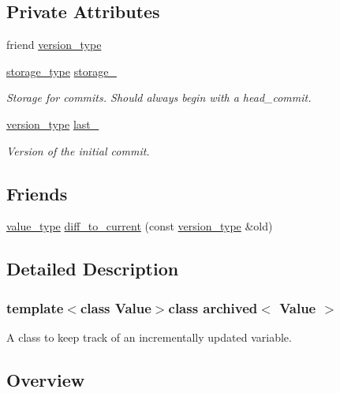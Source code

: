 \subsection*{Private Attributes}
\begin{DoxyCompactItemize}
\item 
friend \hyperlink{classarchived_a451217f8620e57386f93a583dcbc3818}{version\+\_\+type}
\item 
\hyperlink{classarchived_afc884a6d27f4c8fde4d0c2d658f1bc60}{storage\+\_\+type} \hyperlink{classarchived_a237b5ef11e3daff58fb83b1d931f63c0}{storage\+\_\+}
\begin{DoxyCompactList}\small\item\em Storage for commits. Should always begin with a head\+\_\+commit. \end{DoxyCompactList}\item 
\hyperlink{classarchived_a75b8e571e7c6aca9432b9aa2ba601c00}{version\+\_\+type} \hyperlink{classarchived_a0976968f5faa2ce5f3341d9af76c46a1}{last\+\_\+}
\begin{DoxyCompactList}\small\item\em Version of the initial commit. \end{DoxyCompactList}\end{DoxyCompactItemize}
\subsection*{Friends}
\begin{DoxyCompactItemize}
\item 
\hyperlink{classarchived_a0f6c13c55e504fe3bbfc04f3896e5abc}{value\+\_\+type} \hyperlink{classarchived_a65e9c61cc77a5d2e1a53ff1778110494}{diff\+\_\+to\+\_\+current} (const \hyperlink{classarchived_a75b8e571e7c6aca9432b9aa2ba601c00}{version\+\_\+type} \&old)
\end{DoxyCompactItemize}


\subsection{Detailed Description}
\subsubsection*{template$<$class Value$>$class archived$<$ Value $>$}

A class to keep track of an incrementally updated variable. 

\subsection*{Overview}

